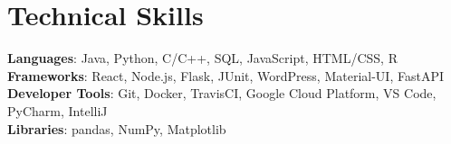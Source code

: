 \documentclass[letterpaper,11pt]{article}
\begin{document}
\section{Technical Skills}
 \begin{itemize}[leftmargin=0.15in, label={}]
    \small{\item{
     \textbf{Languages}{: Java, Python, C/C++, SQL, JavaScript, HTML/CSS, R} \\
     \textbf{Frameworks}{: React, Node.js, Flask, JUnit, WordPress, Material-UI, FastAPI} \\
     \textbf{Developer Tools}{: Git, Docker, TravisCI, Google Cloud Platform, VS Code, PyCharm, IntelliJ} \\
     \textbf{Libraries}{: pandas, NumPy, Matplotlib}
    }}
 \end{itemize}
\end{document}

